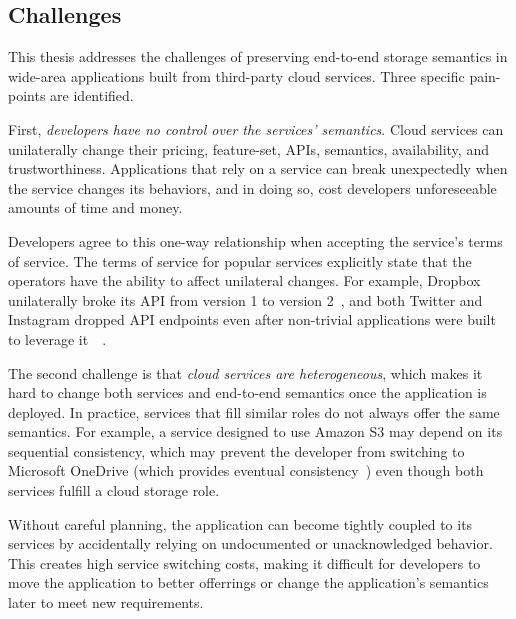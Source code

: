 \subsection{Challenges}

This thesis addresses the challenges of preserving end-to-end storage semantics
in wide-area applications built from third-party cloud services.  Three specific
pain-points are identified.

First, \emph{developers have no control over the services' semantics}.
Cloud services can unilaterally
change their pricing, feature-set, APIs, semantics, availability, and
trustworthiness.  Applications that rely on a service can break unexpectedly
when the service changes its behaviors, and in doing so,
cost developers unforeseeable amounts of time and money.

Developers agree to this one-way relationship when accepting the service's terms of service.  The terms of
service for popular services explicitly state that the operators have the ability to affect unilateral
changes.  For example, Dropbox unilaterally broke its API from version 1 to version
2~\cite{dropbox-v2-api-psa}, and both Twitter and Instagram dropped API
endpoints even after non-trivial
applications were built to leverage
it~\cite{twitter-api-deprecation-psa}~\cite{instagram-api-drop}. %

The second challenge is that \emph{cloud services are heterogeneous}, which
makes it hard to change both services and end-to-end semantics once the application is deployed.
In practice, services that fill similar roles do not always offer the same semantics.
For example, a service designed to use Amazon S3 may 
depend on its sequential consistency, which may prevent the developer from
switching to Microsoft OneDrive (which provides eventual
consistency~\cite{consistency-comparison-cloud-storage}) even though both
services fulfill a cloud storage role.   %

Without careful planning, the application can become tightly coupled
to its services by accidentally relying on undocumented or unacknowledged
behavior.  This creates high service switching costs, making it
difficult for developers to move the application to better
offerrings or change the application's semantics later to meet new requirements.

